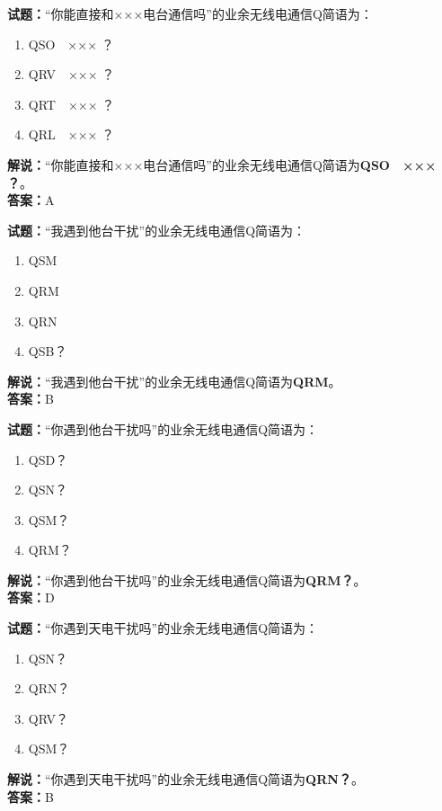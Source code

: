 \documentclass{ctexbook}
\begin{document}
\noindent\textbf{试题：}“你能直接和×××电台通信吗”的业余无线电通信Q简语为：
\begin{enumerate}[leftmargin=3em]
\item QSO　××× ？
\item QRV　××× ？
\item QRT　××× ？
\item QRL　××× ？
\end{enumerate}
\noindent\textbf{解说：}“你能直接和×××电台通信吗”的业余无线电通信Q简语为\textbf{QSO　××× ？}。\\\noindent\textbf{答案：}A



\bigskip


\noindent\textbf{试题：}“我遇到他台干扰”的业余无线电通信Q简语为：
\begin{enumerate}[leftmargin=3em]
\item QSM
\item QRM
\item QRN
\item QSB？
\end{enumerate}
\noindent\textbf{解说：}“我遇到他台干扰”的业余无线电通信Q简语为\textbf{QRM}。\\\noindent\textbf{答案：}B


\bigskip


\noindent\textbf{试题：}“你遇到他台干扰吗”的业余无线电通信Q简语为：
\begin{enumerate}[leftmargin=3em]
\item QSD？
\item QSN？
\item QSM？
\item QRM？
\end{enumerate}
\noindent\textbf{解说：}“你遇到他台干扰吗”的业余无线电通信Q简语为\textbf{QRM？}。\\\noindent\textbf{答案：}D



\bigskip


\noindent\textbf{试题：}“你遇到天电干扰吗”的业余无线电通信Q简语为：
\begin{enumerate}[leftmargin=3em]
\item QSN？
\item QRN？
\item QRV？
\item QSM？
\end{enumerate}
\noindent\textbf{解说：}“你遇到天电干扰吗”的业余无线电通信Q简语为\textbf{QRN？}。\\\noindent\textbf{答案：}B
\end{document}
